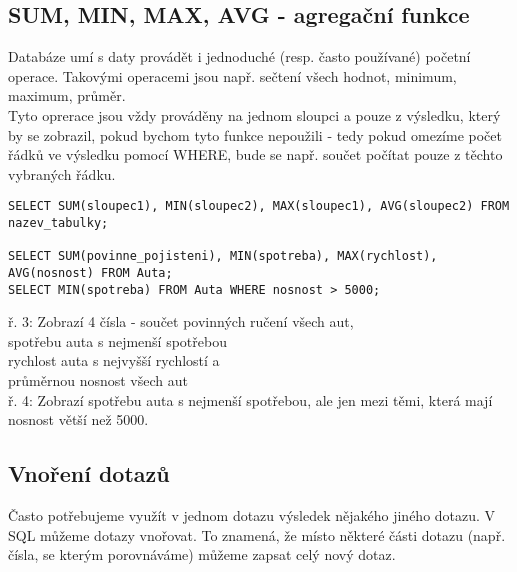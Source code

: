 \subsection{SUM, MIN, MAX, AVG - agregační funkce}

Databáze umí s daty provádět i jednoduché (resp. často používané) početní operace. Takovými operacemi jsou např. sečtení všech hodnot, minimum, maximum, průměr.\\
Tyto oprerace jsou vždy prováděny na jednom sloupci a pouze z výsledku, který by se zobrazil, pokud bychom tyto funkce nepoužili - tedy pokud omezíme počet řádků ve výsledku pomocí WHERE, bude se např. součet počítat pouze z těchto vybraných řádku.\\
\begin{minipage}[t]{.45\textwidth}
\begin{code}
\begin{verbatim}
SELECT SUM(sloupec1), MIN(sloupec2), MAX(sloupec1), AVG(sloupec2) FROM nazev_tabulky;

SELECT SUM(povinne_pojisteni), MIN(spotreba), MAX(rychlost), AVG(nosnost) FROM Auta;
SELECT MIN(spotreba) FROM Auta WHERE nosnost > 5000;
\end{verbatim}
\label{code:sum_min_max_avg}
\end{code}
\end{minipage}
\begin{minipage}[t]{.45\textwidth}
\vspace{1.7cm}
ř. 3:	Zobrazí 4 čísla - součet povinných ručení všech aut,\\ spotřebu auta s nejmenší spotřebou\\ rychlost auta s nejvyšší rychlostí a \\ průměrnou nosnost všech aut\\
ř. 4:	Zobrazí spotřebu auta s nejmenší spotřebou, ale jen mezi těmi, která mají nosnost větší než 5000.
\end{minipage}

\subsection{Vnoření dotazů}

Často potřebujeme využít v jednom dotazu výsledek nějakého jiného dotazu. V SQL můžeme dotazy vnořovat. To znamená, že místo některé části dotazu (např. čísla, se kterým porovnáváme) můžeme zapsat celý nový dotaz.

